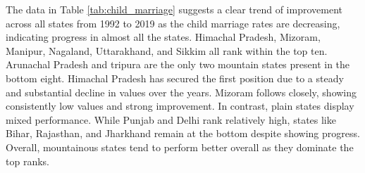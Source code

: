 The data in Table \ref{tab:child_marriage} suggests a clear trend of improvement across all states from 1992 to 2019 as the child marriage rates are decreasing, indicating progress in almost all the states. Himachal Pradesh, Mizoram, Manipur, Nagaland, Uttarakhand, and Sikkim all rank within the top ten. Arunachal Pradesh and tripura are the only two mountain states present in the bottom eight. Himachal Pradesh has secured the first position due to a steady and substantial decline in values over the years. Mizoram follows closely, showing consistently low values and strong improvement. In contrast, plain states display mixed performance. While Punjab and Delhi rank relatively high, states like Bihar, Rajasthan, and Jharkhand remain at the bottom despite showing progress. Overall, mountainous states tend to perform better overall as they dominate the top ranks.

